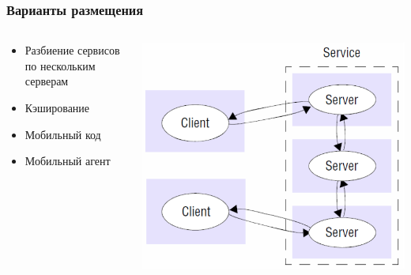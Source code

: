 \documentclass[xetex,mathserif,serif]{beamer}
\begin{document}
	\begin{frame}
		\frametitle{Варианты размещения}
		\begin{columns}
			\begin{column}{0.6\textwidth}
				\begin{itemize}
					\item Разбиение сервисов по нескольким серверам
					\item Кэширование
					\item Мобильный код
					\item Мобильный агент
				\end{itemize}
			\end{column}
			\begin{column}{0.4\textwidth}
				\begin{center}
					\includegraphics[width=\textwidth]{clientServer.png}
				\end{center}
			\end{column}
		\end{columns}
	\end{frame}
\end{document}
